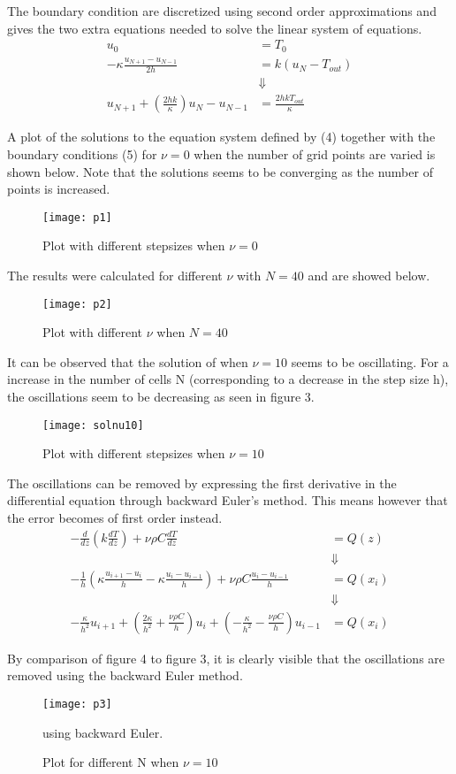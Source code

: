 \documentclass[11pt,a4paper,roman]{scrartcl}
\begin{document}
The boundary condition are discretized using second order approximations and gives the two extra equations needed to solve the linear system of equations.
\begin{equation}
\begin{aligned}
u_0 & = T_0 \\ 
-\kappa\frac{u_{N+1}-u_{N-1}}{2h} & = k(u_N-T_{out}) \\ & \Downarrow \\
u_{N+1}+\left(\frac{2hk}{\kappa}\right)u_N - u_{N-1} & = \frac{2hkT_{out}}{\kappa}
\end{aligned}
\end{equation}




A plot of the solutions to the equation system defined by (4) together with the boundary conditions (5) for $\nu=0$ when the number of grid points are varied is shown below. Note that the solutions seems to be converging as the number of points is increased.
\begin{figure}[H]
\texttt{[image: p1]}
\caption{Plot with different stepsizes when $\nu = 0$}
\end{figure}

The results were calculated for different $\nu$ with $N=40$ and are showed below. 
\begin{figure}[H]
\texttt{[image: p2]}
\caption{Plot with different $\nu$ when $N = 40$}
\end{figure}



It can be observed that the solution of when $\nu = 10$ seems to be oscillating. For a increase in the number of cells N (corresponding to a decrease in the step size h), the oscillations seem to be decreasing as seen in figure 3. 

\begin{figure}[H]
\texttt{[image: solnu10]}
\caption{Plot with different stepsizes when $\nu = 10$}
\end{figure}

The oscillations can be removed by expressing the first derivative in the differential equation through backward Euler's method. This means however that the error becomes of first order instead.
\begin{equation}
\begin{aligned}
-\frac{d}{dz}(k\frac{dT}{dz})+\nu \rho C \frac{dT}{dz} & = Q(z) \\ & \Downarrow \\
-\frac{1}{h}\left(\kappa\frac{u_{i+1}-u_{i}}{h}-\kappa\frac{u_{i}-u_{i-1}}{h}\right) + \nu\rho C \frac{u_{i}-u_{i-1}}{h} & = Q(x_i) \\ & \Downarrow \\
-\frac{\kappa}{h^2}u_{i+1} + \left(\frac{2\kappa}{h^2}+\frac{\nu\rho C}{h}\right)u_i + \left(-\frac{\kappa}{h^2}-\frac{\nu\rho C}{h}\right)u_{i-1}  & = Q(x_i)
\end{aligned}
\end{equation}

By comparison of figure 4 to figure 3, it is clearly visible that the oscillations are removed using the backward Euler method.


\begin{figure}[H]
\centering
\texttt{[image: p3]}
\caption{Plot for different N when $\nu = 10$}using backward Euler.
\end{figure}
\end{document}
